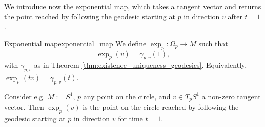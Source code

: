 

We introduce now the exponential map, which takes a tangent vector and returns the point reached by following the geodesic starting at $p$ in direction $v$ after $t=1$. 

\begin{colordef}{Exponential map}{exponential_map}
We define $\exp_p : \Omega_p \to M$ such that
\[
\exp_p(v) = \gamma_{p,v}(1),
\]
with $\gamma_{p,v}$ as in Theorem \ref{thm:existence_uniqueness_geodesics}. Equivalently, $\exp_p(tv) = \gamma_{p,v}(t)$.
\end{colordef}






Consider e.g. $M:=S^1$, $p$ any point on the circle, and $v \in T_p S^1$ a non-zero tangent vector. Then $\exp_p(v)$ is the point on the circle reached by following the geodesic starting at $p$ in direction $v$ for time $t=1$.
\begin{center}
\end{center}


